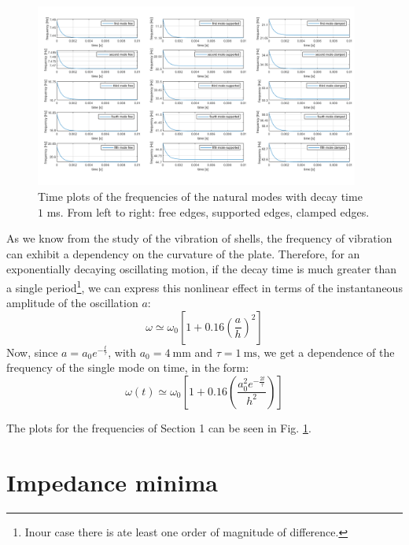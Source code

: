 \documentclass[a4paper]{article}
\begin{document}
\begin{figure}[h]
	\centering\includegraphics[width=0.95\textwidth]{point_3.png}
	\caption{Time plots of the frequencies of the natural modes with decay time $1$ ms. From left to right: free edges, supported edges, clamped edges.}
	\label{fig:dec}
\end{figure}

As we know from the study of the vibration of shells, the frequency of vibration can exhibit a dependency on the curvature of the plate. Therefore, for an exponentially decaying oscillating motion, if the decay time is much greater than a single period\footnote{Inour case there is ate least one order of magnitude of difference.}, we can express this nonlinear effect in terms of the instantaneous amplitude of the oscillation $a$:
$$ \omega \simeq \omega_0 \left[ 1 + 0.16 \left( \frac{a}{h} \right)^2 \right] $$
Now, since $a = a_0 e^{-\frac{t}{\tau}}$, with $a_0 = \SI{4}{\milli\meter}$ and $\tau = \SI{1}{\milli\second}$, we get a dependence of the frequency of the single mode on time, in the form:
$$ \omega(t) \simeq \omega_0 \left[ 1 + 0.16 \left( \frac{a_0^2  e^{-\frac{2t}{\tau}}}{h^2} \right) \right] $$

The plots for the frequencies of Section 1 can be seen in Fig. \ref{fig:dec}.

\section{Impedance minima}



\printbibliography
\end{document}
